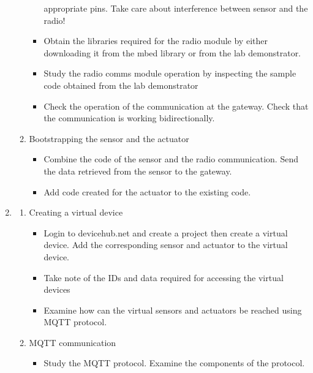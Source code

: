 \documentclass[a4paper]{article}
\begin{document}
\begin{enumerate}
\begin{enumerate}
\begin{itemize}
                              appropriate pins. Take care about interference between sensor and the radio!
                        \item Obtain the libraries required for the radio module by either downloading it from the
                              mbed library or from the lab demonstrator.
                        \item Study the radio comms module operation by inspecting the sample code obtained from the
                              lab demonstrator
                        \item Check the operation of the communication at the gateway. Check that the communication is
                              working bidirectionally.
                    \end{itemize}
              \item Bootstrapping the sensor and the actuator
                    \begin{itemize}
                        \item Combine the code of the sensor and the radio communication. Send the data retrieved
                              from the sensor to the gateway.
                        \item Add code created for the actuator to the existing code.
                    \end{itemize}
          \end{enumerate}
    \item \begin{enumerate}
              \item Creating a virtual device
                    \begin{itemize}
                        \item Login to devicehub.net and create a project then create a virtual device.
                              Add the corresponding sensor and actuator to the virtual device.
                        \item Take note of the IDs and data required for accessing the virtual devices
                        \item Examine how can the virtual sensors and actuators be reached using MQTT protocol.
                    \end{itemize}
              \item MQTT communication
                    \begin{itemize}
                        \item Study the MQTT protocol. Examine the components of the protocol.

\end{itemize}
\end{enumerate}
\end{enumerate}
\end{document}
